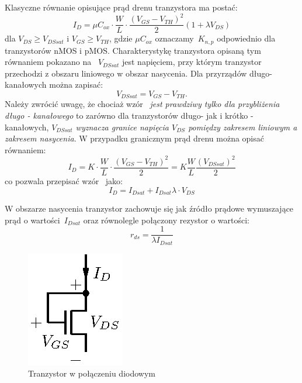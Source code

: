 \documentclass[twoside,pl,final]{labman}
\begin{document}
Klasyczne równanie opisujące prąd drenu tranzystora ma postać:
\begin{equation}
  I_D = \mu C_{ox} \cdot \frac{W}{L} \cdot \frac{(V_{GS} - V_{TH}) ^ 2}{2} (1 + \lambda V_{DS})
  \label{eqn:squarelaw:id}
\end{equation}
dla $V_{DS} \geq V_{DSsat}$ i $V_{GS} \geq V_{TH}$,
gdzie $\mu C_{ox}$ oznaczamy~$K_{n,p}$ odpowiednio dla tranzystorów nMOS i pMOS.
Charakterystykę tranzystora opisaną tym równaniem
pokazano na~ $V_{DSsat}$ jest napięciem,
przy którym tranzystor przechodzi
z obszaru liniowego w obszar nasycenia.
Dla przyrządów długo-kanałowych
 można zapisać:
\begin{equation}
  V_{DSsat} = V_{GS} - V_{TH}.
  \label{eqn:squarelaw:vdssat}
\end{equation}
Należy zwrócić uwagę, że chociaż wzór~
\emph{jest prawdziwy tylko dla przybliżenia długo - kanałowego}
to zarówno dla tranzystorów długo- jak i krótko - kanałowych,
\emph{$V_{DSsat}$ wyznacza granice napięcia $V_{DS}$ pomiędzy
zakresem liniowym a zakresem nasycenia}.
W przypadku granicznym prąd drenu można opisać równaniem:
\begin{equation}
  I_D = K \cdot \frac{W}{L} \cdot \frac{(V_{GS} - V_{TH}) ^ 2}{2} = K \frac{W}{L} \frac{(V_{DSsat}) ^ 2}{2}
  \label{eqn:squarelaw:idsat}
\end{equation}
co pozwala przepisać wzór~ jako:
\begin{equation}
  I_D = I_{Dsat} + I_{Dsat} \lambda \cdot V_{DS}
  \label{eqn:squarelaw:id:idsat}
\end{equation}

W obszarze nasycenia tranzystor zachowuje się jak źródło prądowe wymuszające
prąd o wartości~$I_{Dsat}$ oraz równolegle połączony rezystor o wartości:
\begin{equation}
  r_{ds} = \frac{1}{\lambda I_{Dsat}}
  \label{eqn:squarelaw:ro}
\end{equation}

\begin{figure}[!htbp]
  \centering
  \includegraphics[]{diode}
  \caption{Tranzystor w połączeniu diodowym}
  \label{fig:diode}
\end{figure}
\end{document}
